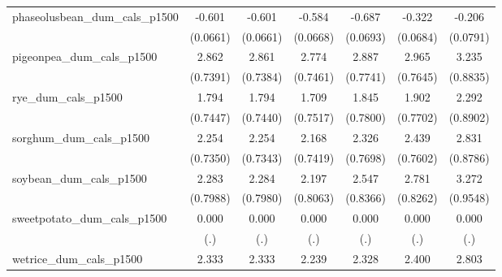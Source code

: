{\begin{tabular}{l*{6}{c}}
\addlinespace
phaseolusbean\_dum\_cals\_p1500&      -0.601\sym{***}&      -0.601\sym{***}&      -0.584\sym{***}&      -0.687\sym{***}&      -0.322\sym{***}&      -0.206\sym{**} \\
                    &    (0.0661)         &    (0.0661)         &    (0.0668)         &    (0.0693)         &    (0.0684)         &    (0.0791)         \\
\addlinespace
pigeonpea\_dum\_cals\_p1500&       2.862\sym{***}&       2.861\sym{***}&       2.774\sym{***}&       2.887\sym{***}&       2.965\sym{***}&       3.235\sym{***}\\
                    &    (0.7391)         &    (0.7384)         &    (0.7461)         &    (0.7741)         &    (0.7645)         &    (0.8835)         \\
\addlinespace
rye\_dum\_cals\_p1500  &       1.794\sym{*}  &       1.794\sym{*}  &       1.709\sym{*}  &       1.845\sym{*}  &       1.902\sym{*}  &       2.292\sym{*}  \\
                    &    (0.7447)         &    (0.7440)         &    (0.7517)         &    (0.7800)         &    (0.7702)         &    (0.8902)         \\
\addlinespace
sorghum\_dum\_cals\_p1500&       2.254\sym{**} &       2.254\sym{**} &       2.168\sym{**} &       2.326\sym{**} &       2.439\sym{**} &       2.831\sym{**} \\
                    &    (0.7350)         &    (0.7343)         &    (0.7419)         &    (0.7698)         &    (0.7602)         &    (0.8786)         \\
\addlinespace
soybean\_dum\_cals\_p1500&       2.283\sym{**} &       2.284\sym{**} &       2.197\sym{**} &       2.547\sym{**} &       2.781\sym{***}&       3.272\sym{***}\\
                    &    (0.7988)         &    (0.7980)         &    (0.8063)         &    (0.8366)         &    (0.8262)         &    (0.9548)         \\
\addlinespace
sweetpotato\_dum\_cals\_p1500&       0.000         &       0.000         &       0.000         &       0.000         &       0.000         &       0.000         \\
                    &         (.)         &         (.)         &         (.)         &         (.)         &         (.)         &         (.)         \\
\addlinespace
wetrice\_dum\_cals\_p1500&       2.333\sym{**} &       2.333\sym{**} &       2.239\sym{**} &       2.328\sym{**} &       2.400\sym{**} &       2.803\sym{**} \\

\end{tabular}}
